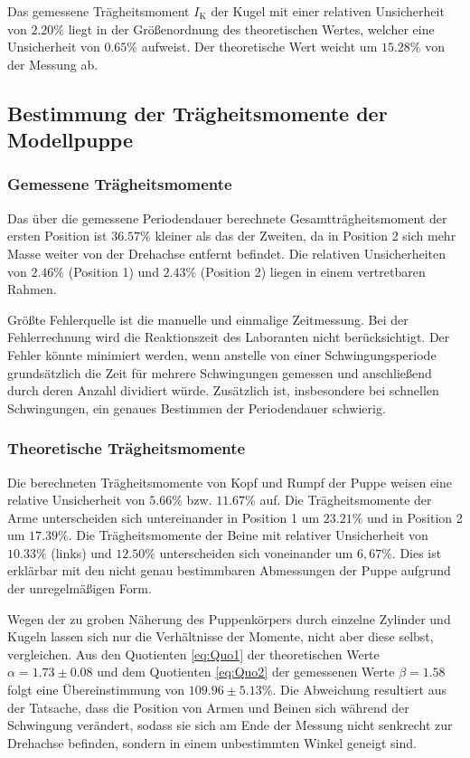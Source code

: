 Das gemessene Trägheitsmoment $I{_\text{K}}$ der Kugel mit einer relativen Unsicherheit von $2.20\%$ liegt in der Größenordnung des theoretischen Wertes, welcher eine Unsicherheit von $0.65\%$ aufweist. 
Der theoretische Wert weicht um $15.28\%$ von der Messung ab.

\subsection{Bestimmung der Trägheitsmomente der Modellpuppe}
\subsubsection{Gemessene Trägheitsmomente}
Das über die gemessene Periodendauer berechnete Gesamtträgheitsmoment der ersten Position ist $36.57\%$ kleiner als das der Zweiten, da in Position 2 sich mehr Masse weiter von der Drehachse entfernt befindet.
Die relativen Unsicherheiten von $2.46\%$ (Position 1) und $2.43\%$ (Position 2) liegen in einem vertretbaren Rahmen.

Größte Fehlerquelle ist die manuelle und einmalige Zeitmessung. 
Bei der Fehlerrechnung wird die Reaktionszeit des Laboranten nicht berücksichtigt. 
Der Fehler könnte minimiert werden, wenn anstelle von einer Schwingungsperiode grundsätzlich die Zeit für mehrere Schwingungen gemessen und anschließend durch deren Anzahl dividiert würde.
Zusätzlich ist, insbesondere bei schnellen Schwingungen, ein genaues Bestimmen der Periodendauer schwierig. 
\subsubsection{Theoretische Trägheitsmomente}
Die berechneten Trägheitsmomente von Kopf und Rumpf der Puppe weisen eine relative Unsicherheit von $5.66\%$ bzw. $11.67\%$ auf. 
Die Trägheitsmomente der Arme unterscheiden sich untereinander in Position 1 um $23.21\%$ und in Position 2 um $17.39\%$. 
Die Trägheitsmomente der Beine mit relativer Unsicherheit von $10.33\%$ (links) und $12.50\%$ unterscheiden sich voneinander um $6,67$\%. 
Dies ist erklärbar mit den nicht genau bestimmbaren Abmessungen der Puppe aufgrund der unregelmäßigen Form.

Wegen der zu groben Näherung des Puppenkörpers durch einzelne Zylinder und Kugeln lassen sich nur die Verhältnisse der Momente, nicht aber diese selbst, vergleichen.
Aus den Quotienten \eqref{eq:Quo1} der theoretischen Werte $\alpha=1.73\pm0.08$ und dem Quotienten \eqref{eq:Quo2} der gemessenen Werte $\beta=1.58$ folgt eine  Übereinstimmung von $109.96\pm5.13\%$. 
Die Abweichung resultiert aus der Tatsache, dass die Position von Armen und Beinen sich während der Schwingung verändert, sodass sie sich am Ende der Messung nicht senkrecht zur Drehachse befinden, sondern in einem unbestimmten Winkel geneigt sind.

